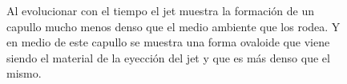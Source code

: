 \documentclass[12pt,a4paper]{book}
\begin{document}
\begin{figure}
\centering
{}
\caption{\label{fig:jet_ma_500} Al evolucionar con el tiempo el jet muestra la formación de un capullo mucho menos denso que el medio ambiente que los rodea. Y en medio de este capullo  se muestra una forma ovaloide que viene siendo el material de la eyección del jet y que es más denso que el mismo.}
\end{figure}
\end{document}

